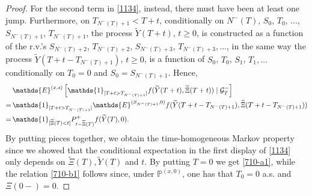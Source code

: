 \documentclass[reqno]{amsart}
\theoremstyle{remark}
\numberwithin{equation}{section} %
\newcommand{\PP}{\mathds{P}}
\newcommand{\1}{\mathds{1}}
\begin{document}
\begin{proof}
		For the second term in \eqref{1134}, instead, there must have been at least one jump. Furthermore, on $T_{N^-(T)+1}<T+t$, conditionally on $N^-(T)$, $S_0$, $T_0$, $\dots$, $S_{N^-(T)+1}$, $T_{N^-(T)+1}$, the process $\widetilde{Y}(T+t)$, $t \geq 0$, is constructed as a function of the r.v.'s $S_{N^-(T)+2}$, $T_{N^-(T)+2}$, $S_{N^-(T)+3}$, $T_{N^-(T)+3},\dots$, in the same way the process $\widetilde{Y}(T+t-T_{N^-(T)+1})$, $t \geq 0$, is a function of $S_0$, $T_0$, $S_1$, $T_1,\dots$ conditionally on $T_0=0$ and $S_0 = S_{N^-(T)+1}$. Hence, 
		\begin{align}
			& \mathds{E}^{(x,s)} \left[ \mathds{1}_{[T+t> T_{N^-(T)+1}]} f (\widetilde{Y}(T+t), \widetilde{\Xi}(T+t)) \mid \mathcal{G}^-_T \right] \notag \\
			= \, & \mathds{1}_{[T+t>T_{N^-(T)+1}]}\mathds{E}^{(S_{N^-(T)+1},0)}f (\widetilde{Y}(T+t-T_{N^-(T)+1}), \widetilde{\Xi}(T+t-T_{N^-(T)+1})) \notag \\
			= \, & \mathds{1}_{[\widetilde{\Xi}(T) < t]} P^+_{t-\widetilde{\Xi}(T)}f(\widetilde{Y}(T),0).
		\end{align}
		By putting pieces together, we obtain the time-homogeneous Markov property since we showed that the conditional expectation in the first display of \eqref{1134} only depends on $\widetilde{\Xi}(T), \widetilde{Y}(T)$ and $t$. By putting $T=0$ we get  \eqref{710-a1}, while the relation \eqref{710-b1} follows since, under $\PP^{(x,0)}$, one has that $T_0=0$ a.s. and $\Xi(0-)=0$.
	\end{proof}
	
\end{document}
